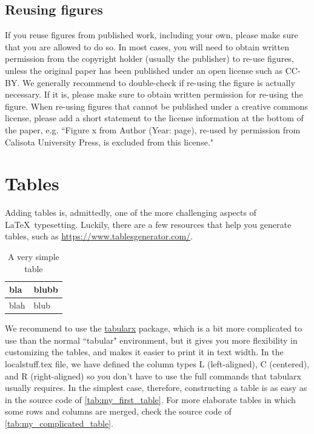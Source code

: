 \subsection*{Reusing figures} \label{sec:reusing}

If you reuse figures from published work, including your own, please make sure that you are allowed to do so. In most cases, you will need to obtain written permission from the copyright holder (usually the publisher) to re-use figures, unless the original paper has been published under an open license such as CC-BY. We generally recommend to double-check if re-using the figure is actually necessary. If it is, please make sure to obtain written permission for re-using the figure. When re-using figures that cannot be published under a creative commons license, please add a short statement to the license information at the bottom of the paper, e.g. ``Figure x from Author (Year: page), re-used by permission from Calisota University Press, is excluded from this license."


\section{Tables}

Adding tables is, admittedly, one of the more challenging aspects of \LaTeX \ typesetting. Luckily, there are a few resources that help you generate tables, such as \url{https://www.tablesgenerator.com/}. 

\begin{table}[H]
    \sffamily \begin{tabularx}{\textwidth}{ | L | L | }
    \hline
         bla & blubb  \\
         \hline
         blah & blub \\
         \hline
    \end{tabularx}
    \caption{A very simple table}
    \label{tab:my_first_table}
\end{table}

\noindent We recommend to use the \href{https://ctan.org/search?phrase=tabularx}{tabularx} package, which is a bit more complicated to use than the normal ``tabular" environment, but it gives you more flexibility in customizing the tables, and makes it easier to print it in text width. In the localstuff.tex file, we have defined the column types L (left-aligned), C (centered), and R (right-aligned) so you don't have to use the full commands that tabularx usually requires. In the simplest case, therefore, constructing a table is as easy as in the source code of \autoref{tab:my_first_table}. For more elaborate tables in which some rows and columns are merged, check the source code of \autoref{tab:my_complicated_table}.


